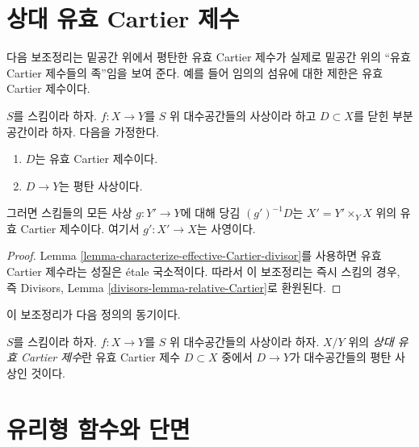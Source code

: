 \section{상대 유효 Cartier 제수}
\label{section-effective-Cartier-morphisms}

\noindent
다음 보조정리는 밑공간 위에서 평탄한 유효 Cartier 제수가 실제로 밑공간
위의 “유효 Cartier 제수들의 족”임을 보여 준다. 예를 들어 임의의 섬유에
대한 제한은 유효 Cartier 제수이다.

\begin{lemma}
\label{lemma-relative-Cartier}
$S$를 스킴이라 하자. $f : X \to Y$를 $S$ 위 대수공간들의 사상이라 하고
$D \subset X$를 닫힌 부분공간이라 하자. 다음을 가정한다.
\begin{enumerate}
\item $D$는 유효 Cartier 제수이다.
\item $D \to Y$는 평탄 사상이다.
\end{enumerate}
그러면 스킴들의 모든 사상 $g : Y' \to Y$에 대해 당김
$(g')^{-1}D$는 $X' = Y' \times_Y X$ 위의 유효 Cartier 제수이다. 여기서
$g' : X' \to X$는 사영이다.
\end{lemma}

\begin{proof}
Lemma \ref{lemma-characterize-effective-Cartier-divisor}를 사용하면 유효
Cartier 제수라는 성질은 \'etale 국소적이다.
따라서 이 보조정리는 즉시 스킴의 경우, 즉 Divisors, Lemma
\ref{divisors-lemma-relative-Cartier}로 환원된다.
\end{proof}

\noindent
이 보조정리가 다음 정의의 동기이다.

\begin{definition}
\label{definition-relative-effective-Cartier-divisor}
$S$를 스킴이라 하자. $f : X \to Y$를 $S$ 위 대수공간들의 사상이라 하자.
$X/Y$ 위의 {\it 상대 유효 Cartier 제수}란 유효 Cartier 제수
$D \subset X$ 중에서 $D \to Y$가 대수공간들의 평탄 사상인 것이다.
\end{definition}









\section{유리형 함수와 단면}
\label{section-meromorphic-functions}


